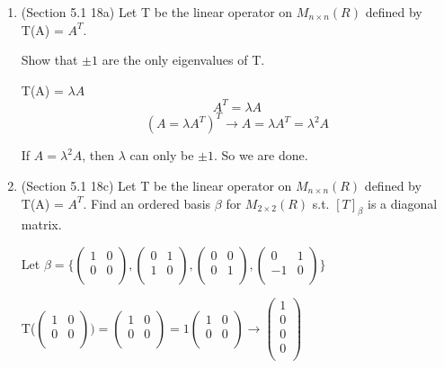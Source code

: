 \documentclass[12pt]{article}
\begin{document}
\begin{enumerate}
    \qedsymbol

    \item (Section 5.1 18a) 
    Let T be the linear operator on $M_{n \times n}(R)$ defined by T(A) = $A^T$. 

    Show that $\pm 1$ are the only eigenvalues of T.

    T(A) = $\lambda A$
    \begin{equation}
        A^T = \lambda A 
    \end{equation}
    \begin{equation}
        (A = \lambda A^T)^T \rightarrow A = \lambda A^T = \lambda^2 A
    \end{equation}

    If $A = \lambda^2 A$, then $\lambda$ can only be $\pm 1$. So we are done.
    \qedsymbol

    \item (Section 5.1 18c) 
    Let T be the linear operator on $M_{n \times n}(R)$ defined by T(A) = $A^T$. Find an ordered basis $\beta$ for $M_{2 \times 2}(R)$ s.t. $[T]_\beta$ is a diagonal matrix. 

    Let $\beta = \{\begin{pmatrix}
        1 & 0 \\
        0 & 0\\
    \end{pmatrix}, \begin{pmatrix}
        0 & 1 \\
        1 & 0\\
    \end{pmatrix}, \begin{pmatrix}
        0 & 0 \\
        0 & 1\\
    \end{pmatrix}, \begin{pmatrix}
        0 & 1 \\
        -1 & 0\\
    \end{pmatrix}\}$

    T($\begin{pmatrix}
        1 & 0 \\
        0 & 0\\
    \end{pmatrix}) = \begin{pmatrix}
        1 & 0 \\
        0 & 0\\
    \end{pmatrix} = 1\begin{pmatrix}
        1 & 0 \\
        0 & 0\\
    \end{pmatrix} \rightarrow \begin{pmatrix}
        1 \\
        0\\
        0\\
        0\\
    \end{pmatrix}$


\end{enumerate}
\end{document}
